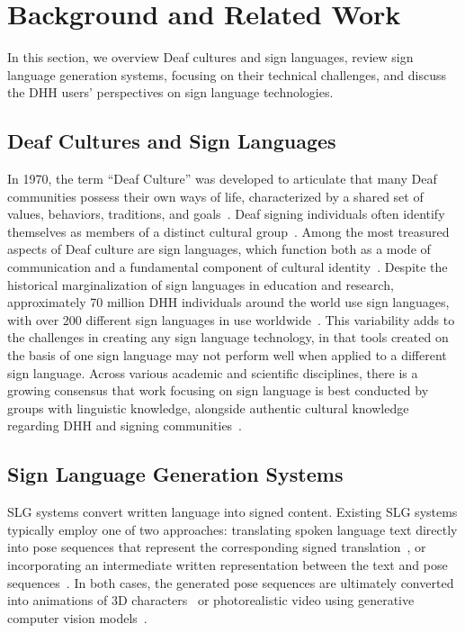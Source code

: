 \section{Background and Related Work}
\label{sec:rw}

In this section, we overview Deaf cultures and sign languages, review sign language generation systems, focusing on their technical challenges, and discuss the DHH users' perspectives on sign language technologies. 

\subsection{Deaf Cultures and Sign Languages}\label{subsec:rw_deaf_culture_asl}

In 1970, the term ``Deaf Culture'' was developed to articulate that many Deaf communities possess their own ways of life, characterized by a shared set of values, behaviors, traditions, and goals~\cite{bragg2021fate,ladd2003understanding}. Deaf signing individuals often identify themselves as members of a distinct cultural group~\cite{obasi2008seeing,padden1988deaf}. Among the most treasured aspects of Deaf culture are sign languages, which function both as a mode of communication and a fundamental component of cultural identity~\cite{glickman1993deaf,bragg_sign_2019,bda}. Despite the historical marginalization of sign languages in education and research, approximately 70 million DHH individuals around the world use sign languages, with over 200 different sign languages in use worldwide~\cite{wfd,huenerfauth2009sign,bragg2021fate}. This variability adds to the challenges in creating any sign language technology, in that tools created on the basis of one sign language may not perform well when applied to a different sign language. Across various academic and scientific disciplines, there is a growing consensus that work focusing on sign language is best conducted by groups with linguistic knowledge, alongside authentic cultural knowledge regarding DHH and signing communities~\cite{desai2024systemic,bragg2021fate}.

\subsection{Sign Language Generation Systems}
\label{subsec:rw_SLG}

SLG systems convert written language into signed content. Existing SLG systems typically employ one of two approaches: translating spoken language text directly into pose sequences that represent the corresponding signed translation~\cite{hwang2024universal,hwang2024gloss}, or incorporating an intermediate written representation between the text and pose sequences~\cite{stoll_text2sign_2020, saunders_progressive_2020, moryossef2023open, walsh_sign_2024, xie2024g2p, saunders2020adversarial, arkushin2023ham2pose}. In both cases, the generated pose sequences are ultimately converted into animations of 3D characters~\cite{kim2022sign,kipp2011sign} or photorealistic video using generative computer vision models~\cite{saunders_signing_2022,stoll_text2sign_2020,saunders2020everybody}. 

